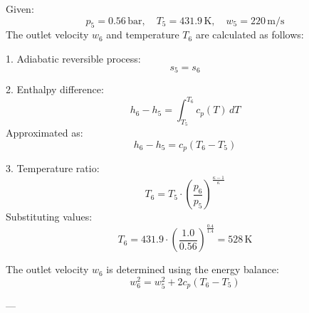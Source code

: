 Given:  
\[
p_5 = 0.56 \, \text{bar}, \quad T_5 = 431.9 \, \text{K}, \quad w_5 = 220 \, \text{m/s}
\]  
The outlet velocity \( w_6 \) and temperature \( T_6 \) are calculated as follows:  

1. Adiabatic reversible process:  
\[
s_5 = s_6
\]  

2. Enthalpy difference:  
\[
h_6 - h_5 = \int_{T_5}^{T_6} c_p(T) \, dT
\]  
Approximated as:  
\[
h_6 - h_5 = c_p (T_6 - T_5)
\]  

3. Temperature ratio:  
\[
T_6 = T_5 \cdot \left( \frac{p_6}{p_5} \right)^{\frac{\kappa - 1}{\kappa}}
\]  
Substituting values:  
\[
T_6 = 431.9 \cdot \left( \frac{1.0}{0.56} \right)^{\frac{0.4}{1.4}} = 528 \, \text{K}
\]  

The outlet velocity \( w_6 \) is determined using the energy balance:  
\[
w_6^2 = w_5^2 + 2 c_p (T_6 - T_5)
\]  

---